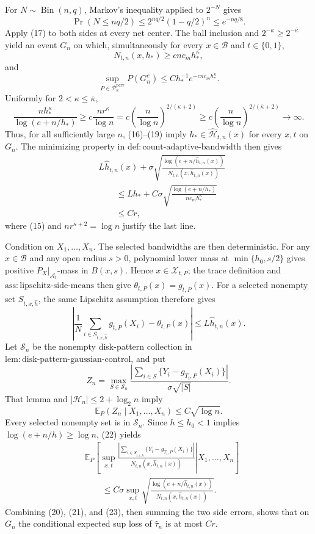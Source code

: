 For \(N\sim\operatorname{Bin}(n,q)\), Markov's inequality applied to \(2^{-N}\) gives
\[
 \Pr(N\le nq/2)
 \le2^{nq/2}(1-q/2)^n
 \le e^{-nq/8}. \tag{17}
\]
Apply (17) to both sides at every net center.  The ball inclusion and \(2^{-\kappa}\ge2^{-\overline\kappa}\) yield an event \(G_n\) on which, simultaneously for every \(x\in\mathcal B\) and \(t\in\{0,1\}\),
\[
 N_{t,n}(x,h_*)\ge c n c_mh_*^\kappa,
\]
and
\[
 \sup_{P\in\mathcal P_\kappa^{\mathrm{perv}}}P(G_n^c)
 \le Ch_*^{-1}e^{-c n c_mh_*^\kappa}. \tag{18}
\]
Uniformly for \(2<\kappa\le\overline\kappa\),
\[
 \frac{nh_*^\kappa}{\log(e+n/h_*)}
 \ge c\frac{nr^\kappa}{\log n}
 =c\left(\frac n{\log n}\right)^{2/(\kappa+2)}
 \ge c\left(\frac n{\log n}\right)^{2/(\overline\kappa+2)}
 \longrightarrow\infty. \tag{19}
\]
Thus, for all sufficiently large \(n\), (16)--(19) imply \(h_*\in\widehat{\mathcal H}_{t,n}(x)\) for every \(x,t\) on \(G_n\).  The minimizing property in \(\mathrm{def:count\text{-}adaptive\text{-}bandwidth}\) then gives
\[
 \begin{aligned}
 &L\widehat h_{t,n}(x)+\sigma
 \sqrt{\frac{\log(e+n/\widehat h_{t,n}(x))}
 {N_{t,n}(x,\widehat h_{t,n}(x))}}\\
 &\qquad\le Lh_*+C\sigma
 \sqrt{\frac{\log(e+n/h_*)}{nc_mh_*^\kappa}}\\
 &\qquad\le Cr, \tag{20}
 \end{aligned}
\]
where (15) and \(nr^{\kappa+2}=\log n\) justify the last line.

Condition on \(X_1,\ldots,X_n\).  The selected bandwidths are then deterministic.  For any \(x\in\mathcal B\) and any open radius \(s>0\), polynomial lower mass at \(\min\{h_0,s/2\}\) gives positive \(P_X|_{\mathcal A_t}\)-mass in \(B(x,s)\).  Hence \(x\in\mathcal X_{t,P}\); the trace definition and \(\mathrm{ass:lipschitz\text{-}side\text{-}means}\) then give \(\theta_{t,P}(x)=g_{t,P}(x)\).  For a selected nonempty set \(S_{t,x,\widehat h}\), the same Lipschitz assumption therefore gives
\[
 \left|
 \frac1N\sum_{i\in S_{t,x,\widehat h}}g_{t,P}(X_i)-\theta_{t,P}(x)
 \right|
 \le L\widehat h_{t,n}(x). \tag{21}
\]
Let \(\mathscr S_n\) be the nonempty disk-pattern collection in \(\mathrm{lem:disk\text{-}pattern\text{-}gaussian\text{-}control}\), and put
\[
 Z_n=\max_{S\in\mathscr S_n}
 \frac{|\sum_{i\in S}\{Y_i-g_{T_i,P}(X_i)\}|}{\sigma\sqrt{|S|}}.
\]
That lemma and \(|\mathcal H_n|\le2+\log_2n\) imply
\[
 \mathbb E_P(Z_n\mid X_1,\ldots,X_n)\le C\sqrt{\log n}. \tag{22}
\]
Every selected nonempty set is in \(\mathscr S_n\).  Since \(h\le h_0<1\) implies \(\log(e+n/h)\ge\log n\), (22) yields
\[
 \begin{aligned}
 &\mathbb E_P\left[
 \left.
 \sup_{x,t}
 \frac{|\sum_{i\in S_{t,x,\widehat h}}\{Y_i-g_{T_i,P}(X_i)\}|}
 {N_{t,n}(x,\widehat h_{t,n}(x))}
 \right|X_1,\ldots,X_n\right]\\
 &\qquad\le C\sigma\sup_{x,t}
 \sqrt{\frac{\log(e+n/\widehat h_{t,n}(x))}
 {N_{t,n}(x,\widehat h_{t,n}(x))}}. \tag{23}
 \end{aligned}
\]
Combining (20), (21), and (23), then summing the two side errors, shows that on \(G_n\) the conditional expected sup loss of \(\widehat\tau_n\) is at most \(Cr\).

